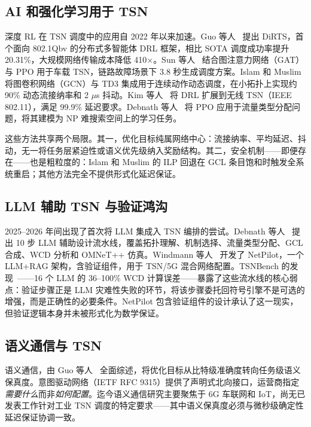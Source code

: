 \documentclass[UTF8]{ctexart}
\begin{document}
\subsection{AI 和强化学习用于 TSN}

深度 RL 在 TSN 调度中的应用自 2022 年以来加速。Guo 等人~\cite{guo2024dirt} 提出 DiRTS，首个面向 802.1Qbv 的分布式多智能体 DRL 框架，相比 SOTA 调度成功率提升 20.31\%，大规模网络传输成本降低 410$\times$。Sun 等人~\cite{sun2024gatppo} 结合图注意力网络（GAT）与 PPO 用于车载 TSN，链路故障场景下 3.8 秒生成调度方案。Islam 和 Muslim~\cite{islam2024gcntd3} 将图卷积网络（GCN）与 TD3 集成用于连续动作动态调度，在小拓扑上实现约 90\% 动态流接纳率和 2 $\mu$s 抖动。Kim 等人~\cite{kim2024drl} 将 DRL 扩展到无线 TSN（IEEE 802.11），满足 99.9\% 延迟要求。Debnath 等人~\cite{debnath2025tta} 将 PPO 应用于流量类型分配问题，将其建模为 NP 难搜索空间上的学习任务。

这些方法共享两个局限。其一，优化目标纯属网络中心：流接纳率、平均延迟、抖动，无一将任务层紧迫性或语义优先级纳入奖励结构。其二，安全机制——即便存在——也是粗粒度的：Islam 和 Muslim 的 ILP 回退在 GCL 条目饱和时触发全系统重启；其他方法完全不提供形式化延迟保证。

\subsection{LLM 辅助 TSN 与验证鸿沟}

2025--2026 年间出现了首次将 LLM 集成入 TSN 编排的尝试。Debnath 等人~\cite{debnath2025llmtsn} 提出 10 步 LLM 辅助设计流水线，覆盖拓扑理解、机制选择、流量类型分配、GCL 合成、WCD 分析和 OMNeT++ 仿真。Windmann 等人~\cite{windmann2025netpilot} 开发了 NetPilot，一个 LLM+RAG 架构，含验证组件，用于 TSN/5G 混合网络配置。TSNBench 的发现~\cite{debnath2026tsnbench}——16 个 LLM 的 36--100\% WCD 计算误差——暴露了这些流水线的核心弱点：验证步骤正是 LLM 灾难性失败的环节，将该步骤委托回符号引擎不是可选的增强，而是正确性的必要条件。NetPilot 包含验证组件的设计承认了这一现实，但验证逻辑本身并未被形式化为数学保证。

\subsection{语义通信与 TSN}

语义通信，由 Guo 等人~\cite{guo2024semanticcom} 全面综述，将优化目标从比特级准确度转向任务级语义保真度。意图驱动网络（IETF RFC 9315）提供了声明式北向接口，运营商指定\textit{需要什么}而非\textit{如何配置}。迄今语义通信研究主要聚焦于 6G 车联网和 IoT，尚无已发表工作针对工业 TSN 调度的特定要求——其中语义保真度必须与微秒级确定性延迟保证协调一致。
\end{document}
